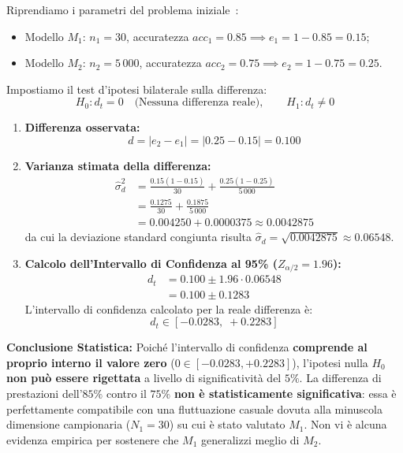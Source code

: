 \begin{example}
Riprendiamo i parametri del problema iniziale~\cite{tan2018}:
\begin{itemize}
    \item Modello $M_1$: $n_1 = 30$, accuratezza $acc_1 = 0.85 \implies e_1 = 1 - 0.85 = 0.15$;
    \item Modello $M_2$: $n_2 = 5\,000$, accuratezza $acc_2 = 0.75 \implies e_2 = 1 - 0.75 = 0.25$.
\end{itemize}
Impostiamo il test d'ipotesi bilaterale sulla differenza:
\begin{equation}
    H_0: d_t = 0 \quad \text{(Nessuna differenza reale)}, \qquad H_1: d_t \ne 0
\end{equation}
\begin{enumerate}
    \item \textbf{Differenza osservata:}
    \begin{equation}
        d = |e_2 - e_1| = |0.25 - 0.15| = 0.100
    \end{equation}
    \item \textbf{Varianza stimata della differenza:}
    \begin{align}
        \hat{\sigma}_d^2 &= \frac{0.15(1 - 0.15)}{30} + \frac{0.25(1 - 0.25)}{5\,000} \nonumber \\
        &= \frac{0.1275}{30} + \frac{0.1875}{5\,000} \nonumber \\
        &= 0.004250 + 0.0000375 \approx 0.0042875
    \end{align}
    da cui la deviazione standard congiunta risulta $\hat{\sigma}_d = \sqrt{0.0042875} \approx 0.06548$.
    \item \textbf{Calcolo dell'Intervallo di Confidenza al 95\% ($Z_{\alpha/2} = 1.96$):}
    \begin{align}
        d_t &= 0.100 \pm 1.96 \cdot 0.06548 \nonumber \\
        &= 0.100 \pm 0.1283
    \end{align}
    L'intervallo di confidenza calcolato per la reale differenza è:
    \begin{equation}
        d_t \in [-0.0283, \; +0.2283]
    \end{equation}
\end{enumerate}
\textbf{Conclusione Statistica:} Poiché l'intervallo di confidenza \textbf{comprende al proprio interno il valore zero} ($0 \in [-0.0283, +0.2283]$), l'ipotesi nulla $H_0$ \textbf{non può essere rigettata} a livello di significatività del $5\%$.
La differenza di prestazioni dell'$85\%$ contro il $75\%$ \textbf{non è statisticamente significativa}: essa è perfettamente compatibile con una fluttuazione casuale dovuta alla minuscola dimensione campionaria ($N_1 = 30$) su cui è stato valutato $M_1$. Non vi è alcuna evidenza empirica per sostenere che $M_1$ generalizzi meglio di $M_2$.
\end{example}

